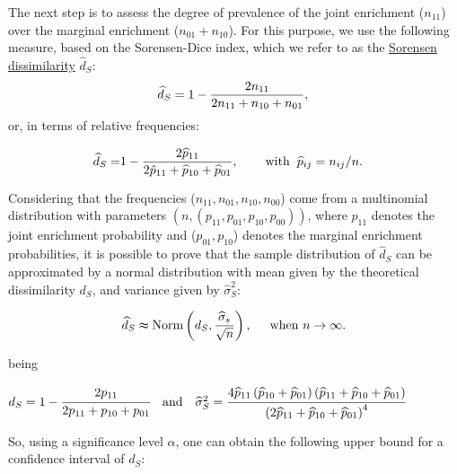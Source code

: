 The next step is to assess the degree of prevalence of the joint enrichment (\(n_{11}\)) over the marginal enrichment (\(n_{01} + n_{10}\)). For this purpose, we use the following measure, based on the Sorensen-Dice index, which we refer to as the \hyperref[fig:cycle]{Sorensen dissimilarity} \(\widehat{d}_S\):
\begin{equation*}
\widehat{d}_S = 1 - \dfrac{2n_{11}}{2n_{11} + n_{10} + n_{01}}, \\
\end{equation*}
or, in terms of relative frequencies:

\begin{equation*}
\begin{aligned}
\widehat{d}_S = & 1 - \dfrac{2\widehat{p}_{11}}{2\hat{p}_{11} + \widehat{p}_{10} + \widehat{p}_{01}}, \hspace{0.75cm}  \text{with} \hspace{0.2cm} \widehat{p}_{ij} = n_{ij} / n.
\end{aligned}
\end{equation*}

Considering that the frequencies (\(n_{11}, n_{01}, n_{10}, n_{00}\)) come from a multinomial distribution with parameters \((n, (p_{11}, p_{01}, p_{10}, p_{00}))\), where \(p_{11}\) denotes the joint enrichment probability and (\(p_{01}, p_{10}\)) denotes the marginal enrichment probabilities, it is possible to prove that the sample distribution of \(\widehat{d}_S\) can be approximated by a normal distribution with mean given by the theoretical dissimilarity \(d_S\), and variance given by \(\widehat \sigma _S^2\):

\begin{equation*}
\begin{aligned}
\widehat{d}_S \thickapprox \text{Norm} \left(d_S, \frac{\widehat{\sigma}_s}{\sqrt{n}}\right), 
\hspace{0.5cm} \text{when }  n \to \infty.
\end{aligned}
\end{equation*}

being

\(d_S = 1 - \cfrac{2p_{11}}{2p_{11} + p_{10} + p_{01}} \quad \text{and} \quad \widehat{\sigma}_S^2 = \cfrac{4\widehat{p}_{11}\left(\widehat{p}_{10} + \widehat{p}_{01}\right)\left(\widehat{p}_{11} + \widehat{p}_{10} + \widehat{p}_{01}\right)}{\left(2\widehat{p}_{11} + \widehat{p}_{10} + \widehat{p}_{01}\right)^4}\)

So, using a significance level \(\alpha\), one can obtain the following upper bound for a confidence interval of \(d_S\):


